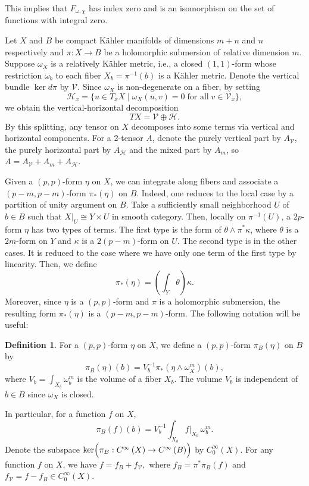 \documentclass{amsart}
\numberwithin{equation}{section}
\theoremstyle{plain}
\theoremstyle{definition}
\newtheorem{definition}[equation]{Definition}
\theoremstyle{remark}
\begin{document}
This implies that $F_{\omega, \chi}$ has index zero and is an isomorphism on the set of functions with integral zero. 

Let $X$ and $B$ be compact K{\"a}hler manifolds of dimensions $m + n$ and $n$ respectively and $\pi : X \rightarrow B$ be a holomorphic submersion of relative dimension $m$.
Suppose $\omega_X$ is a relatively K{\"a}hler metric, i.e., a closed $(1,1)$-form whose restriction $\omega_b$ to each fiber $X_b = \pi^{-1}(b)$ is a K{\"a}hler metric. Denote the vertical bundle $\mathop{\mathrm{ker}}d\pi$ by $\mathcal{V}$. 
Since $\omega_X$ is non-degenerate on a fiber, by setting 
$$ \mathcal{H}_x = \{ u \in T_x X \mid \omega_X (u, v)=0 \; \textrm{for all} \; v \in \mathcal{V}_x \},$$
we obtain the vertical-horizontal decomposition 
$$ TX = \mathcal{V} \oplus \mathcal{H}. $$
By this splitting, any tensor on $X$ decomposes into some terms via vertical and horizontal components. For a 2-tensor $A$, denote the purely vertical part by $A_\mathcal{V}$, the purely horizontal part by $A_\mathcal{H}$ and the mixed part by $A_m$, so $A =A_\mathcal{V} + A_m + A_\mathcal{H}$.

Given a $(p, p)$-form $\eta$ on $X$, we can integrate along fibers and associate a $(p-m, p-m)$-form $\pi_*(\eta)$ on $B$. Indeed, one reduces to the local case by a partition of unity argument on $B$. Take a sufficiently small neighborhood $U$ of $b \in B$ such that $ X|_U \cong Y \times U$ in smooth category. Then, locally on $\pi^{-1}(U)$,
a $2p$-form $\eta$ has two types of terms. 
The first type is the form of $\theta \wedge \pi^*\kappa$, where $\theta$ is a $2m$-form on $Y$ and $\kappa$ is a $2(p-m)$-form on $U$.
The second type is in the other cases. It is reduced to the case where we have only one term of the first type by linearity. 
Then, we define 
$$ \pi_*(\eta) = \left( \int_Y \theta \right) \kappa. $$
Moreover, since $\eta$ is a $(p,p)$-form and $\pi$ is a holomorphic submersion, the resulting form $\pi_*(\eta)$ is a $(p-m,p-m)$-form.
The following notation will be useful:

\begin{definition}\label{def:piB}
For a $(p,p)$-form $\eta$ on $X$, 
we define a $(p,p)$-form $\pi_B(\eta)$ on $B$ by 
$$ \pi_B(\eta)(b) =  V_b^{-1} \pi_*(\eta \wedge \omega_X^m)(b),$$ 
where $V_b = \int_{X_b} \omega_b^m$ is the volume of a fiber $X_b$. The volume $V_b$ is independent of $b \in B$ since $\omega_X$ is closed.
\end{definition}
In particular, for a function $f$ on $X$, 
$$\pi_B(f)(b) =  V_b^{-1} \int_{X_b} f \vert_{X_b} \, \omega_b^m. $$
Denote the subspace $\mathop{\mathrm{ker}}\Bigl( \pi_B : C^\infty \left( X \right) \rightarrow C^\infty \left( B \right) \Bigr)$ by $C_0^\infty \left( X \right)$. 
For any function $f$ on $X$, we have 
$ f = f_B + f_\mathcal{V},$
where $f_B = \pi^*\pi_B (f)$ and $f_\mathcal{V} = f - f_B \in C_0^\infty \left( X \right)$.
\end{document}
